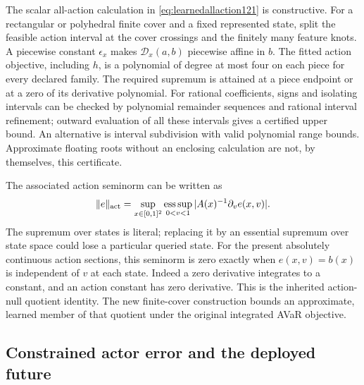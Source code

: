 The scalar all-action calculation in
\eqref{eq:learnedallaction121} is constructive.
For a rectangular or polyhedral finite cover and a
fixed represented state, split the feasible action
interval at the cover crossings and the finitely
many feature knots.  A piecewise constant
\(\epsilon_x\) makes \(\mathcal D_x(a,b)\) piecewise
affine in \(b\).  The fitted action objective,
including \(h\), is a polynomial of degree at most
four on each piece for every declared family.
The required supremum is attained at a piece
endpoint or at a zero of its derivative polynomial.
For rational coefficients, signs and isolating
intervals can be checked by polynomial remainder
sequences and rational interval refinement; outward
evaluation of all these intervals gives a certified
upper bound.  An alternative is interval subdivision
with valid polynomial range bounds.  Approximate
floating roots without an enclosing calculation
are not, by themselves, this certificate.

The associated action seminorm can be written as
\[
 \|e\|_{\rm act}
 =\sup_{x\in[0,1]^2}
      \operatorname*{ess\,sup}_{0<v<1}
               |A(x)^{-1}\partial_ve(x,v)|.
\]
The supremum over states is literal; replacing it
by an essential supremum over state space could
lose a particular queried state.
For the present absolutely continuous action
sections, this seminorm is zero exactly when
\(e(x,v)=b(x)\) is independent of \(v\) at each
state.  Indeed a zero derivative integrates to
a constant, and an action constant has zero
derivative.  This is the inherited action-null
quotient identity.  The new finite-cover
construction bounds an approximate, learned
member of that quotient under the original
integrated AVaR objective.

\subsection{Constrained actor error and the deployed future}

